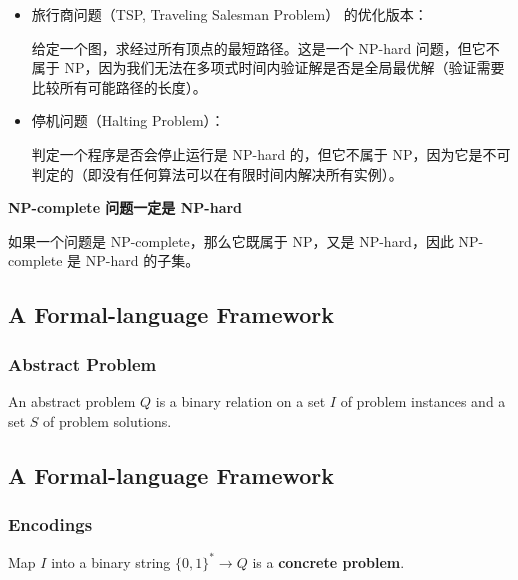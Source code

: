 \documentclass{article}
\begin{document}
\begin{itemize}
    \item 旅行商问题（TSP, Traveling Salesman Problem） 的优化版本：
    
    给定一个图，求经过所有顶点的最短路径。这是一个 NP-hard 问题，但它不属于 NP，因为我们无法在多项式时间内验证解是否是全局最优解（验证需要比较所有可能路径的长度）。

    \item 停机问题（Halting Problem）：
    
    判定一个程序是否会停止运行是 NP-hard 的，但它不属于 NP，因为它是不可判定的（即没有任何算法可以在有限时间内解决所有实例）。
\end{itemize}

\textbf{NP-complete 问题一定是 NP-hard}

如果一个问题是 NP-complete，那么它既属于 NP，又是 NP-hard，因此 NP-complete 是 NP-hard 的子集。

\subsection{A Formal-language Framework}

\subsubsection{Abstract Problem}
An abstract problem $Q$ is a binary relation on a set $I$ of problem instances and a set $S$ of problem solutions.

\subsection{A Formal-language Framework}

\subsubsection{Encodings}
Map $I$  into a binary string $\{ 0, 1 \}^*\rightarrow Q$ is a \textbf{concrete problem}.
\end{document}
